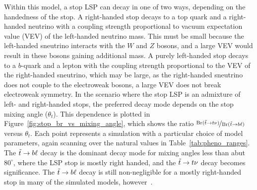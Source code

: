 Within this model, a stop LSP can decay in one of two ways, depending on
the handedness of the stop.
A right-handed stop decays to a top quark and a right-handed neutrino with a
coupling strength proportional to vacuum expectation value (VEV) of the
left-handed neutrino mass.
This must be small because the left-handed sneutrino interacts with the
$W$ and $Z$ bosons, and a large VEV would result in these bosons gaining
additional mass.
A purely left-handed stop decays to a $b$-quark and a lepton with the coupling
strength proportional to the VEV of the right-handed sneutrino, which may be
large, as the right-handed sneutrino does not couple to the electroweak bosons,
a large VEV does not break electroweak symmetry.
In the scenario where the stop LSP is an admixture of left- and right-handed
stops, the preferred decay mode depends on the stop mixing angle ($\theta_t$).
This dependence is plotted in Figure~\ref{fig:stop_br_vs_mixing_angle}, which
shows the ratio
$\nicefrac{\mathrm{Br}(\tilde{t} \rightarrow t\nu)}{\mathrm{Br}(\tilde{t} \rightarrow b\ell)}$
versus $\theta_t$.
Each point represents a simulation with a particular choice of model parameters,
again scanning over the natural values in Table~\ref{tab:pheno_ranges}.
The $\tilde{t} \rightarrow b\ell$ decay is the dominant decay mode for mixing angles less
than abut $80^{\circ}$, where the LSP stop is mostly right handed, and the
$\tilde{t} \rightarrow t\nu$ decay becomes significance.
The $\tilde{t} \rightarrow b\ell$ decay is still non-negligible for a mostly right-handed
stop in many of the simulated models,
however~\cite{Marshall:2014cwa,Marshall:2014kea}.

